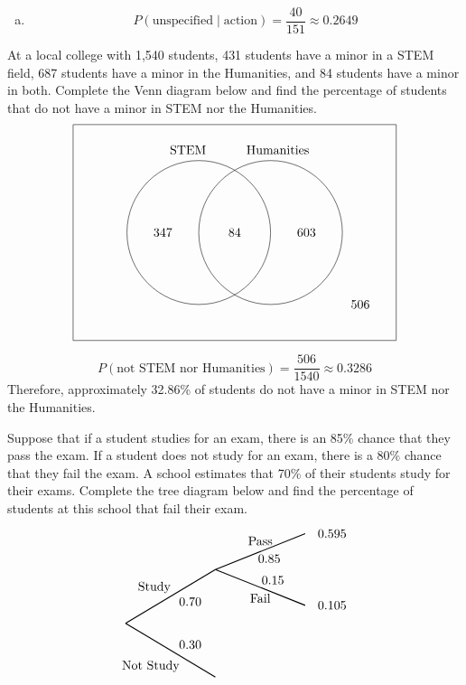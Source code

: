 \documentclass[12pt,letterpaper]{exam}
\begin{document}
\begin{questions}
\begin{enumerate}[(a)]
\item 
	\[
	P(\text{unspecified} \;|\; \text{action})= \dfrac{40}{151} \approx 0.2649
	\]
\end{enumerate}



\newpage
\question[10] At a local college with 1,540 students, 431 students have a minor in a STEM field, 687 students have a minor in the Humanities, and 84 students have a minor in both. Complete the Venn diagram below and find the percentage of students that do not have a minor in STEM nor the Humanities. 
	\[
	\begin{tikzpicture}
	\draw (0,0) rectangle (9,6);
	\draw (3.5,3) circle (2);
	\draw (5.5,3) circle (2);
	
	\node at (3.2,5.3) {STEM};
	\node at (5.7,5.3) {Humanities}; 
	
	\node at (2.5,3) {347};
	\node at (4.5,3) {84};
	\node at (6.5,3) {603};
	\node at (8,1) {506};
	\end{tikzpicture}
	\] 
	
	\[
	P(\text{not STEM nor Humanities})= \dfrac{506}{1540} \approx 0.3286
	\] \pspace
Therefore, approximately 32.86\% of students do not have a minor in STEM nor the Humanities. 



\newpage
\question[10] Suppose that if a student studies for an exam, there is an 85\% chance that they pass the exam. If a student does not study for an exam, there is a 80\% chance that they fail the exam. A school estimates that 70\% of their students study for their exams. Complete the tree diagram below and find the percentage of students at this school that fail their exam. 
	\[
	\begin{tikzpicture}[scale= 1.0]
	\def\FirstUpLabel{Study}
	\def\FirstDownLabel{Not Study}
	\def\SecondUpLabel{Pass}
	\def\SecondDownLabel{Fail}
	\def\Up{$0.70$}
	\def\Down{$0.30$}
	\def\UpUp{$0.85$}
	\def\UpDown{$0.15$}
	\def\DownUp{$0.20$}
	\def\DownDown{$0.80$}
	\def\first{$0.595$}
	\def\second{$0.105$}
	\def\third{$0.060$}
	\def\fourth{$0.240$}
		
	\node at (0.8,1) {\FirstUpLabel};	
	\node at (0.7,-1.2) {\FirstDownLabel};	
	\node at (1.8,0.6) {\Up};
	\node at (1.8,-0.6) {\Down};
	\draw[thick] (0,0) -- (2.5,1.5);
	\draw[thick] (0,0) -- (2.5,-1.5);
		
	\node at (3.75,2.3) {\SecondUpLabel};
	\node at (3.75,0.7) {\SecondDownLabel};
	\node at (4,1.8) {\UpUp};
	\node at (4.1,1.2) {\UpDown};
	\node at (5.75,2.5) {\first};
	\node at (5.75,0.5) {\second};
	\draw[thick] (2.5,1.5) -- (5,2.5);
	\draw[thick] (2.5,1.5) -- (5,0.5);


\end{tikzpicture}\]
\end{questions}
\end{document}
